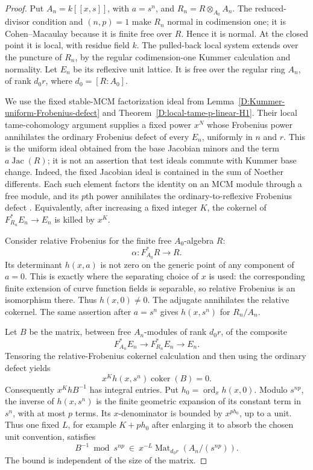 \begin{proof}
Put $A_n=k[[x,s]]$, with $a=s^n$, and
$R_n=R\otimes_{A_0}A_n$.  The reduced-divisor condition and
$(n,p)=1$ make $R_n$ normal in codimension one; it is
Cohen--Macaulay because it is finite free over $R$.  Hence it is
normal.  At the closed point it is local, with residue field $k$.
The pulled-back local system extends over the puncture of $R_n$,
by the regular codimension-one Kummer calculation and normality.
Let $E_n$ be its reflexive unit lattice.  It is free over the
regular ring $A_n$, of rank $d_0r$, where $d_0=[R:A_0]$.

We use the fixed stable-MCM factorization ideal from
Lemma~\ref{D:Kummer-uniform-Frobenius-defect} and
Theorem~\ref{D:local-tame-p-linear-H1}.  Their local
tame-cohomology argument supplies a fixed
power $x^N$ whose Frobenius power annihilates the ordinary
Frobenius defect of every $E_n$, uniformly in $n$ and $r$.
This is the uniform ideal obtained from the base Jacobian
minors and the term $a\operatorname{Jac}(R)$; it is not an
assertion that test ideals commute with Kummer base change.
Indeed, the fixed Jacobian ideal is contained in the sum of
Noether differents.  Each such element factors the identity
on an MCM module through a free module, and its $p$th power
annihilates the ordinary-to-reflexive Frobenius defect
\citep[section~2; section~3, formula~(3.1) and
Examples~3.2--3.3, pp.~2--3 and 6--7]{C_IyengarTakahashiStable}.
Equivalently, after increasing a fixed integer $K$, the cokernel
of $F_{R_n}^*E_n\to E_n$ is killed by $x^K$.

Consider relative Frobenius for the finite free $A_0$-algebra $R$:
\[
             \alpha:F_{A_0}^*R\longrightarrow R.
\]
Its determinant $h(x,a)$ is not zero on the generic point of
any component of $a=0$.  This is exactly where the separating
choice of $x$ is used: the corresponding finite extension of
curve function fields is separable, so relative Frobenius is
an isomorphism there.  Thus $h(x,0)\ne0$.  The adjugate
annihilates the relative cokernel.  The same assertion after
$a=s^n$ gives $h(x,s^n)$ for $R_n/A_n$.

Let $B$ be the matrix, between free $A_n$-modules of rank
$d_0r$, of the composite
\[
       F_{A_n}^*E_n\longrightarrow F_{R_n}^*E_n
                              \longrightarrow E_n.
\]
Tensoring the relative-Frobenius cokernel calculation and
then using the ordinary defect yields
\[
                 x^K h(x,s^n)\operatorname{coker}(B)=0.
                                                        \tag{D.TC.5}
\]
Consequently $x^K h B^{-1}$ has integral entries.
Put $h_0=\operatorname{ord}_x h(x,0)$.  Modulo $s^{np}$,
the inverse of $h(x,s^n)$ is the finite geometric expansion
of its constant term in $s^n$, with at most $p$ terms.
Its $x$-denominator is bounded by $x^{p h_0}$, up to a unit.
Thus one fixed $L$, for example $K+p h_0$ after enlarging
it to absorb the chosen unit convention, satisfies
\[
 B^{-1}\bmod s^{np}\ \in\
     x^{-L}\operatorname{Mat}_{d_0r}
                        (A_n/(s^{np})).                 \tag{D.TC.6}
\]
The bound is independent of the size of the matrix.


\end{proof}
